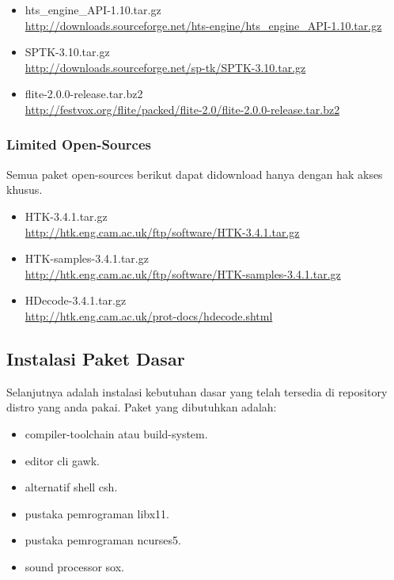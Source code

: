 \documentclass[12pt,]{article}
\begin{document}
\begin{itemize}
		\item hts\_engine\_API-1.10.tar.gz \\
		\url{http://downloads.sourceforge.net/hts-engine/hts_engine_API-1.10.tar.gz}
		
		\item SPTK-3.10.tar.gz \\
		\url{http://downloads.sourceforge.net/sp-tk/SPTK-3.10.tar.gz}

		\item flite-2.0.0-release.tar.bz2 \\
		\url{http://festvox.org/flite/packed/flite-2.0/flite-2.0.0-release.tar.bz2}
	\end{itemize}
	
	\subsubsection{Limited Open-Sources}
	
	Semua paket open-sources berikut dapat didownload hanya dengan hak akses khusus.
	
	\begin{itemize}
		\item HTK-3.4.1.tar.gz \\
		\url{http://htk.eng.cam.ac.uk/ftp/software/HTK-3.4.1.tar.gz}
		
		\item HTK-samples-3.4.1.tar.gz \\
		\url{http://htk.eng.cam.ac.uk/ftp/software/HTK-samples-3.4.1.tar.gz}
		
		\item HDecode-3.4.1.tar.gz \\
		\url{http://htk.eng.cam.ac.uk/prot-docs/hdecode.shtml}
		
		
	\end{itemize}

	\subsection{Instalasi Paket Dasar}
	
	Selanjutnya adalah instalasi kebutuhan dasar yang telah tersedia di repository distro yang anda pakai.
	Paket yang dibutuhkan adalah:
	
	\begin{itemize}
		\item compiler-toolchain atau build-system.
		\item editor cli gawk.
		\item alternatif shell csh.
		\item pustaka pemrograman libx11.
		\item pustaka pemrograman ncurses5.
		\item sound processor sox.
	\end{itemize}
\end{document}
